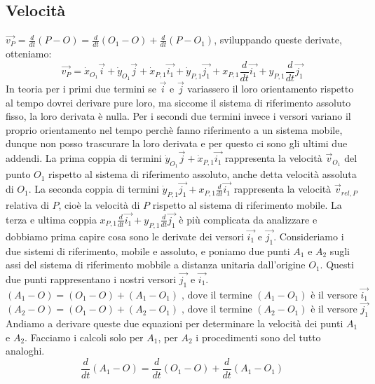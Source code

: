 \subsection{Velocità}
$\vec{v_P} = \frac{d}{dt} (P-O) = \frac{d}{dt} (O_1 - O) + \frac{d}{dt} (P-O_1)$, sviluppando queste derivate, otteniamo: 
\[
    \vec{v_P} = 
        \dot{x}_{O_1}\vec{i} + 
        \dot{y}_{O_1} \vec{j} + 
        \dot{x}_{P,1} \vec{i_1} + 
        \dot{y}_{P,1} \vec{j_1} + 
        x_{P,1} \frac{d}{dt}\vec{i_1} + 
        y_{P,1} \frac{d}{dt} \vec{j_1}
\]
In teoria per i primi due termini se $\vec{i}$ e $\vec{j}$ variassero il loro orientamento rispetto al tempo dovrei derivare pure loro, ma siccome il sistema di riferimento assoluto fisso, la loro derivata è nulla. Per i secondi due termini invece i versori variano il proprio orientamento nel tempo perchè fanno riferimento a un sistema mobile, dunque non posso trascurare la loro derivata e per questo ci sono gli ultimi due addendi.\newline
La prima coppia di termini $\dot{y}_{O_1} \vec{j} + \dot{x}_{P,1} \vec{i_1}$ rappresenta la velocità $\vec{v}_{O_1}$ del punto $O_1$ rispetto al sistema di riferimento assoluto, anche detta velocità assoluta di $O_1$.\newline
La seconda coppia di termini $\dot{y}_{P,1} \vec{j_1} + x_{P,1} \frac{d}{dt}\vec{i_1}$ rappresenta la velocità $\vec{v}_{rel, P}$ relativa di $P$, cioè la velocità di $P$ rispetto al sistema di riferimento mobile.\newline
La terza e ultima coppia $x_{P,1} \frac{d}{dt}\vec{i_1} + y_{P,1} \frac{d}{dt} \vec{j_1}$ è più complicata da analizzare e dobbiamo prima capire cosa sono le derivate dei versori $\vec{i_1}$ e $\vec{j_1}$.\newline
Consideriamo i due sistemi di riferimento, mobile e assoluto, e poniamo due punti $A_1$ e $A_2$ sugli assi del sistema di riferimento mobbile a distanza unitaria dall'origine $O_1$. Questi due punti rappresentano i nostri versori $\vec{j_1}$ e $\vec{i_1}$.
\[
    (A_1 - O) = (O_1-O) + (A_1 - O_1) \;\text{, dove il termine $(A_1-O_1)$ è il versore $\vec{i_1}$}\;
\]
\[
    (A_2 - O) = (O_1-O) + (A_2 - O_1) \;\text{, dove il termine $(A_2-O_1)$ è il versore $\vec{j_1}$}\;
\]
Andiamo a derivare queste due equazioni per determinare la velocità dei punti $A_1$ e $A_2$. Facciamo i calcoli solo per $A_1$, per $A_2$ i procedimenti sono del tutto analoghi.
\[
    \frac{d}{dt}(A_1-O) = \frac{d}{dt}(O_1 - O) + \frac{d}{dt}(A_1 -O_1)
\]
